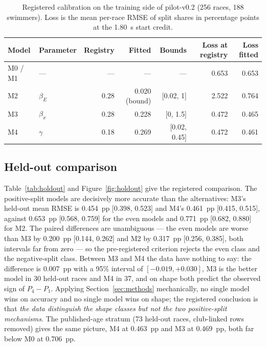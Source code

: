 \begin{table}[htbp]
\centering
\caption{Registered calibration on the training side of pilot-v0.2 (256
races, 188 swimmers). Loss is the mean per-race RMSE of split shares in
percentage points at the 1.80~s start credit.}
\label{tab:fits}
\begin{tabular}{llrrrrr}
\toprule
Model & Parameter & Registry & Fitted & Bounds & Loss at registry & Loss fitted \\
\midrule
M0 / M1 & --- & --- & --- & --- & 0.653 & 0.653 \\
M2 & $\beta_E$ & 0.28 & 0.020 (bound) & [0.02, 1] & 2.522 & 0.764 \\
M3 & $\beta_x$ & 0.28 & 0.228 & [0, 1.5] & 0.472 & 0.465 \\
M4 & $\gamma$ & 0.18 & 0.269 & [0.02, 0.45] & 0.472 & 0.461 \\
\bottomrule
\end{tabular}
\end{table}

\subsection{Held-out comparison}

Table~\ref{tab:holdout} and Figure~\ref{fig:holdout} give the registered
comparison. The positive-split models are decisively more accurate than the
alternatives: M3's held-out mean RMSE is 0.454~pp [0.398, 0.523] and M4's
0.461~pp [0.415, 0.515], against 0.653~pp [0.568, 0.759] for the even
models and 0.771~pp [0.682, 0.880] for M2. The paired differences are
unambiguous --- the even models are worse than M3 by 0.200~pp
[0.144, 0.262] and M2 by 0.317~pp [0.256, 0.385], both intervals far from
zero --- so the pre-registered criterion rejects the even class and the
negative-split class. Between M3 and M4 the data have nothing to say: the
difference is 0.007~pp with a 95\% interval of $[-0.019, +0.030]$, M3 is
the better model in 30 held-out races and M4 in 37, and on shape both
predict the observed sign of $P_4-P_1$. Applying Section~\ref{sec:methods}
mechanically, no single model wins on accuracy and no single model wins on
shape; the registered conclusion is that \emph{the data distinguish the
shape classes but not the two positive-split mechanisms}. The
published-age stratum (73 held-out races, club-linked rows removed) gives
the same picture, M4 at 0.463~pp and M3 at 0.469~pp, both far below M0 at
0.706~pp.


